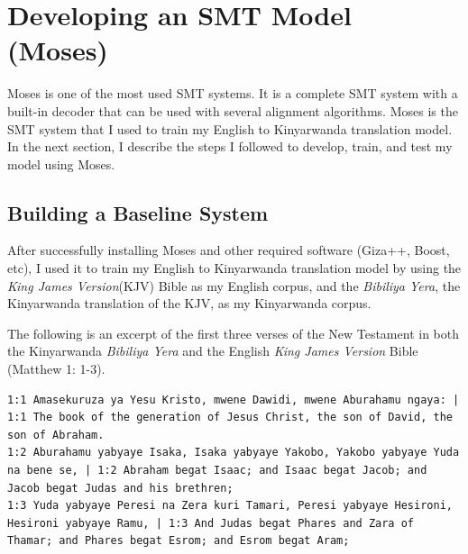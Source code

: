 \chapter{Developing an SMT Model (Moses)}
Moses is one of the most used SMT systems. It is a complete SMT system with a built-in decoder that can be used with several alignment algorithms. Moses is the SMT system that I used to train my English to Kinyarwanda translation model. In the next section, I describe the steps I followed to develop, train, and test my model using Moses. 
\section{Building a Baseline System}
After successfully installing Moses and other required software (Giza++, Boost, etc), I used it to train my English to Kinyarwanda translation model by using the \textit{King James Version}(KJV) Bible as my English corpus, and the \textit{Bibiliya Yera},  the Kinyarwanda translation of the KJV, as my Kinyarwanda corpus. 


The following is an excerpt of the first three verses of the New Testament in both the Kinyarwanda \textit{Bibiliya Yera} and the English \textit{King James Version} Bible (Matthew 1: 1-3). 
\begin{lstlisting}[breaklines]
1:1 Amasekuruza ya Yesu Kristo, mwene Dawidi, mwene Aburahamu ngaya: | 1:1 The book of the generation of Jesus Christ, the son of David, the son of Abraham.
1:2 Aburahamu yabyaye Isaka, Isaka yabyaye Yakobo, Yakobo yabyaye Yuda na bene se, | 1:2 Abraham begat Isaac; and Isaac begat Jacob; and Jacob begat Judas and his brethren;
1:3 Yuda yabyaye Peresi na Zera kuri Tamari, Peresi yabyaye Hesironi, Hesironi yabyaye Ramu, | 1:3 And Judas begat Phares and Zara of Thamar; and Phares begat Esrom; and Esrom begat Aram;
\end{lstlisting}

